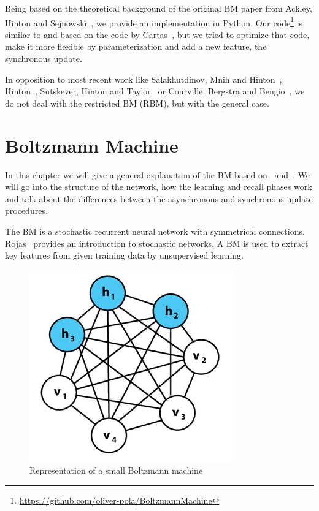 \documentclass[12pt,twoside]{article}
\theoremstyle{plain}
\theoremstyle{definition}
\theoremstyle{remark}
\begin{document}
Being based on the theoretical background of the original BM paper from Ackley, Hinton and Sejnowski~\cite{Ackley}, we provide an implementation in Python. Our code\footnote{\url{https://github.com/oliver-pola/BoltzmannMachine}} is similar to and based on the code by Cartas~\cite{BMImpl}, but we tried to optimize that code, make it more flexible by parameterization and add a new feature, the synchronous update.

In opposition to most recent work like Salakhutdinov, Mnih and Hinton~\cite{Salakhutdinov}, Hinton~\cite{Hinton}, Sutskever, Hinton and Taylor~\cite{Sutskever} or Courville, Bergstra and Bengio~\cite{Courville}, we do not deal with the restricted BM (RBM), but with the general case.


\section{Boltzmann Machine}
\label{sec:bm}

In this chapter we will give a general explanation of the BM based on~\cite{Ackley} and~\cite[Chapter~43]{MacKay}. We will go into the structure of the network, how the learning and recall phases work and talk about the differences between the asynchronous and synchronous update procedures.

The BM is a stochastic recurrent neural network with symmetrical connections.
Rojas~\cite[Chapter~14]{Rojas} provides an introduction to stochastic networks.
A BM is used to extract key features from given training data by unsupervised learning.

\begin{figure}[h]
	\centering
	\includegraphics[height=0.2\textheight]{src/boltzmann_graph}
	\caption[Representation of a small Boltzmann machine]{Representation of a small Boltzmann machine\footnotemark}
	\label{fig:boltzmann-graph}
\end{figure}
\end{document}
